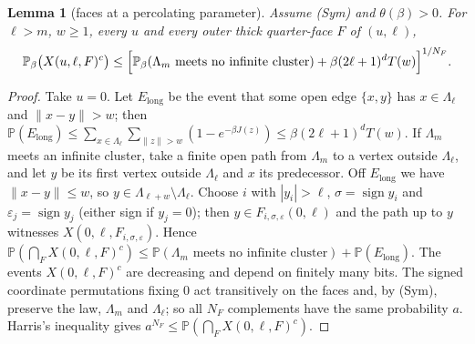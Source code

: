 \documentclass[11pt]{article}
\newtheorem{lemma}[theorem]{Lemma}
\theoremstyle{definition}
\theoremstyle{remark}
\numberwithin{equation}{section}
\newcommand{\Pp}{\mathbb P}
\newcommand{\1}{\mathbf 1}
\newcommand{\Lam}{\Lambda}
\newcommand{\norm}[1]{\|#1\|}
\begin{document}
\begin{lemma}[faces at a percolating parameter]\label{lem:faces}
Assume \textup{(Sym)} and $\theta(\beta)>0$. For $\ell>m$, $w\ge1$, every $u$ and every outer thick
quarter-face $F$ of $(u,\ell)$,
\[
\Pp_\beta\bigl(X(u,\ell,F)^c\bigr)\le\Bigl[\Pp_\beta(\Lam_m\text{ meets no infinite cluster})
+\beta(2\ell+1)^dT(w)\Bigr]^{1/N_F}.
\]
\end{lemma}
\begin{proof}
Take $u=0$. Let $E_{\mathrm{long}}$ be the event that some open edge $\{x,y\}$ has $x\in\Lam_\ell$
and $\norm{x-y}>w$; then
$\Pp(E_{\mathrm{long}})\le\sum_{x\in\Lam_\ell}\sum_{\norm{z}>w}(1-e^{-\beta J(z)})\le\beta(2\ell+1)^dT(w)$.
If $\Lam_m$ meets an infinite cluster, take a finite open path from $\Lam_m$ to a vertex outside
$\Lam_\ell$, and let $y$ be its first vertex outside $\Lam_\ell$ and $x$ its predecessor. Off
$E_{\mathrm{long}}$ we have $\norm{x-y}\le w$, so $y\in\Lam_{\ell+w}\setminus\Lam_\ell$. Choose $i$ with
$|y_i|>\ell$, $\sigma=\operatorname{sign}y_i$ and $\varepsilon_j=\operatorname{sign}y_j$ (either sign
if $y_j=0$); then $y\in F_{i,\sigma,\varepsilon}(0,\ell)$ and the path up to $y$ witnesses
$X(0,\ell,F_{i,\sigma,\varepsilon})$. Hence
$\Pp(\bigcap_FX(0,\ell,F)^c)\le\Pp(\Lam_m\text{ meets no infinite cluster})+\Pp(E_{\mathrm{long}})$.
The events $X(0,\ell,F)^c$ are decreasing and depend on finitely many bits. The signed coordinate
permutations fixing $0$ act transitively on the faces and, by (Sym), preserve the law, $\Lam_m$
and $\Lam_\ell$; so all $N_F$ complements have the same probability $a$. Harris's inequality gives
$a^{N_F}\le\Pp(\bigcap_FX(0,\ell,F)^c)$.
\end{proof}
\end{document}
